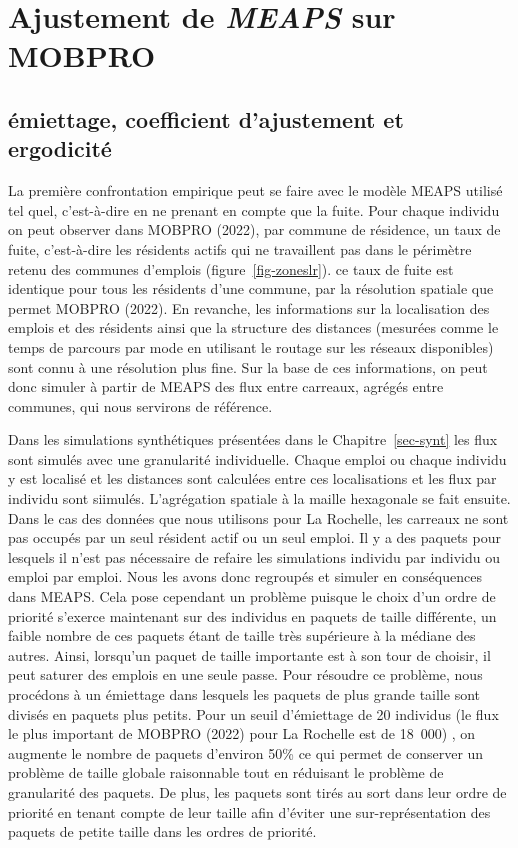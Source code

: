 \documentclass[
  10pt,
  a4paper,
  numbers=noendperiod,
  DIV=9]{scrartcl}
\begin{document}
\hypertarget{sec-ajust}{%
\section{\texorpdfstring{Ajustement de \emph{MEAPS} sur
MOBPRO}{Ajustement de MEAPS sur MOBPRO}}\label{sec-ajust}}

\hypertarget{uxe9miettage-coefficient-dajustement-et-ergodicituxe9}{%
\subsection{émiettage, coefficient d'ajustement et
ergodicité}\label{uxe9miettage-coefficient-dajustement-et-ergodicituxe9}}

La première confrontation empirique peut se faire avec le modèle MEAPS
utilisé tel quel, c'est-à-dire en ne prenant en compte que la fuite.
Pour chaque individu on peut observer dans MOBPRO (2022), par commune de
résidence, un taux de fuite, c'est-à-dire les résidents actifs qui ne
travaillent pas dans le périmètre retenu des communes d'emplois
(figure~\ref{fig-zoneslr}). ce taux de fuite est identique pour tous les
résidents d'une commune, par la résolution spatiale que permet MOBPRO
(2022). En revanche, les informations sur la localisation des emplois et
des résidents ainsi que la structure des distances (mesurées comme le
temps de parcours par mode en utilisant le routage sur les réseaux
disponibles) sont connu à une résolution plus fine. Sur la base de ces
informations, on peut donc simuler à partir de MEAPS des flux entre
carreaux, agrégés entre communes, qui nous servirons de référence.

Dans les simulations synthétiques présentées dans le
Chapitre~\ref{sec-synt} les flux sont simulés avec une granularité
individuelle. Chaque emploi ou chaque individu y est localisé et les
distances sont calculées entre ces localisations et les flux par
individu sont siimulés. L'agrégation spatiale à la maille hexagonale se
fait ensuite. Dans le cas des données que nous utilisons pour La
Rochelle, les carreaux ne sont pas occupés par un seul résident actif ou
un seul emploi. Il y a des paquets pour lesquels il n'est pas nécessaire
de refaire les simulations individu par individu ou emploi par emploi.
Nous les avons donc regroupés et simuler en conséquences dans MEAPS.
Cela pose cependant un problème puisque le choix d'un ordre de priorité
s'exerce maintenant sur des individus en paquets de taille différente,
un faible nombre de ces paquets étant de taille très supérieure à la
médiane des autres. Ainsi, lorsqu'un paquet de taille importante est à
son tour de choisir, il peut saturer des emplois en une seule passe.
Pour résoudre ce problème, nous procédons à un émiettage dans lesquels
les paquets de plus grande taille sont divisés en paquets plus petits.
Pour un seuil d'émiettage de 20 individus (le flux le plus important de
MOBPRO (2022) pour La Rochelle est de 18~000) , on augmente le nombre de
paquets d'environ 50\% ce qui permet de conserver un problème de taille
globale raisonnable tout en réduisant le problème de granularité des
paquets. De plus, les paquets sont tirés au sort dans leur ordre de
priorité en tenant compte de leur taille afin d'éviter une
sur-représentation des paquets de petite taille dans les ordres de
priorité.
\end{document}
